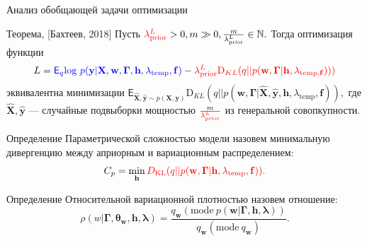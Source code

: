 \documentclass[usenames,dvipsnames,11pt,pdf,utf8,russian,aspectratio=43]{beamer}
\begin{document}
\begin{frame}{Анализ обобщающей задачи оптимизации}
\small

\vspace{-0.1cm}
\begin{block}{Теорема, [Бахтеев, 2018]}
Пусть $\textcolor{red}{\lambda_\text{prior}^L} > 0, m \gg 0, \frac{m}{\lambda_\text{prior}^L} \in \mathbb{N}.$ Тогда оптимизация функции\vspace{-0.3cm} \[L = 
\textcolor{blue}{\mathsf{E}_q \text{log}~{p(\mathbf{y} | \mathbf{X}, \mathbf{w}, \boldsymbol{\Gamma}, \mathbf{h}, \lambda_{\text{temp}},\mathbf{f})}} - \textcolor{red}{\lambda_\text{prior}^L\text{D}_{KL}(q||p(\mathbf{w}, \boldsymbol{\Gamma} |\mathbf{h}, \lambda_{\text{temp}, \mathbf{f}})))}\vspace{-0.2cm}\] эквивалентна минимизации $\mathsf{E}_{\hat{\mathbf{X}}, \hat{\mathbf{y}}\sim p(\mathbf{X}, \mathbf{y})}\text{D}_{KL}(q||p(\mathbf{w}, \boldsymbol{\Gamma} | \hat{\mathbf{X}}, \hat{\mathbf{y}},\mathbf{h},\lambda_{\text{temp}},\mathbf{f})),$ где $\hat{\mathbf{X}}, \hat{\mathbf{y}}$ --- случайные подвыборки мощностью $\frac{m}{\textcolor{red}{\lambda_\text{prior}^L}}$ из генеральной совопкупности.
\end{block}
\vspace{-0.2cm} 
\begin{block}{Определение}
Параметрической сложностью модели назовем минимальную дивергенцию между априорным и вариационным распределением:
\vspace{-0.2cm}
\[
    C_p = \min_{\mathbf{h}} \textcolor{red}{D_\text{KL}(q||p(\mathbf{w}, \boldsymbol{\Gamma}|\mathbf{h},\lambda_\text{temp}, \mathbf{f})).}
\]
\end{block}
\vspace{-0.2cm} 
\begin{block}{Определение}
Относительной вариационной   плотностью  назовем отношение:
\[
\rho(w|\boldsymbol{\Gamma},\boldsymbol{\theta}_\mathbf{w}, \mathbf{h},\boldsymbol{\lambda})=\frac{q_\mathbf{w}(\text{mode}~p(\mathbf{w}|\boldsymbol{\Gamma}, \mathbf{h}, \boldsymbol{\lambda}))}{q_\mathbf{w}(\text{mode}~{q_\mathbf{w}})}.
\]
\end{block}



\end{frame}
\end{document}
